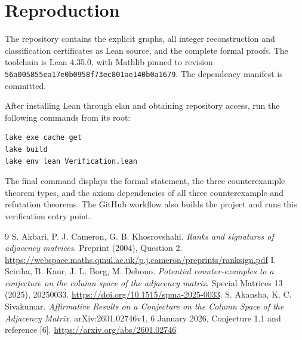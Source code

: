 \documentclass[11pt]{article}
\begin{document}
\section*{Reproduction}
The repository contains the explicit graphs, all integer
reconstruction and classification certificates as Lean source,
and the complete formal proofs.
The toolchain is Lean 4.35.0, with Mathlib pinned to revision
\texttt{56a005855ea17e0b0958f73ec801ae140b0a1679}.
The dependency manifest is committed.

After installing Lean through elan and obtaining repository access,
run the following commands from its root:
\begin{Verbatim}[fontsize=\small]
lake exe cache get
lake build
lake env lean Verification.lean
\end{Verbatim}
The final command displays the formal statement, the three
counterexample theorem types, and the axiom dependencies of all
three counterexample and refutation theorems. The GitHub workflow
also builds the project and runs this verification entry point.
\begin{thebibliography}{9}
 S. Akbari, P. J. Cameron, G. B. Khosrovshahi. \emph{Ranks and signatures of adjacency matrices}. Preprint (2004), Question 2. \url{https://webspace.maths.qmul.ac.uk/p.j.cameron/preprints/ranksign.pdf}
 I. Sciriha, B. Kaur, J. L. Borg, M. Debono. \emph{Potential counter-examples to a conjecture on the column space of the adjacency matrix}. Special Matrices 13 (2025), 20250033. \url{https://doi.org/10.1515/spma-2025-0033}.
 S. Akansha, K. C. Sivakumar. \emph{Affirmative Results on a Conjecture on the Column Space of the Adjacency Matrix}. arXiv:2601.02746v1, 6 January 2026, Conjecture 1.1 and reference [6]. \url{https://arxiv.org/abs/2601.02746}
\end{thebibliography}
\end{document}
